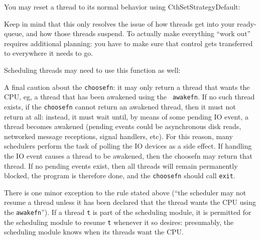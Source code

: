You may reset a thread to its normal behavior using CthSetStrategyDefault:


Keep in mind that this only resolves the issue of how threads get into
your ready-queue, and how those threads suspend.  To actually make
everything ``work out'' requires additional planning: you have to make
sure that control gets transferred to everywhere it needs to go.

Scheduling threads may need to use this function as well:


A final caution about the {\tt choosefn}: it may only return a thread
that wants the CPU, eg, a thread that has been awakened using the {\tt
awakefn}.  If no such thread exists, if the {\tt choosefn} cannot
return an awakened thread, then it must not return at all: instead, it
must wait until, by means of some pending IO event, a thread becomes
awakened (pending events could be asynchronous disk reads, networked
message receptions, signal handlers, etc).  For this reason, many
schedulers perform the task of polling the IO devices as a side
effect.  If handling the IO event causes a thread to be awakened, then
the choosefn may return that thread.  If no pending events exist, then
all threads will remain permanently blocked, the program is therefore
done, and the {\tt choosefn} should call {\tt exit}.

There is one minor exception to the rule stated above (``the scheduler
may not resume a thread unless it has been declared that the thread
wants the CPU using the {\tt awakefn}'').  If a thread {\tt t} is part
of the scheduling module, it is permitted for the scheduling module to
resume {\tt t} whenever it so desires: presumably, the scheduling
module knows when its threads want the CPU.

